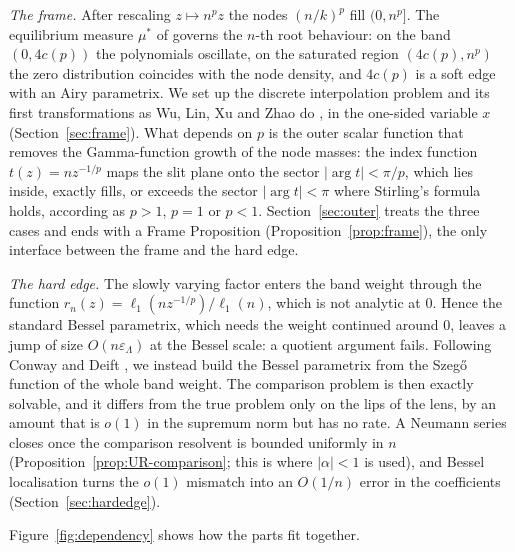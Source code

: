\emph{The frame.} After rescaling $z\mapsto n^pz$ the nodes $(n/k)^p$ fill $(0,n^p]$. The equilibrium measure $\mu^*$
of \cite{Paper1} governs the $n$-th root behaviour: on the band $(0,4c(p))$ the polynomials oscillate, on the saturated
region $(4c(p),n^p)$ the zero distribution coincides with the node density, and $4c(p)$ is a soft edge with an
Airy parametrix. We set up the discrete interpolation problem and its first transformations as Wu, Lin, Xu and Zhao
do \cite{WLXZ}, in the one-sided variable $x$ (Section~\ref{sec:frame}). What depends on $p$ is the outer scalar
function that removes the Gamma-function growth of the node masses: the index function $t(z)=nz^{-1/p}$ maps the slit
plane onto the sector $|\arg t|<\pi/p$, which lies inside, exactly fills, or exceeds the sector $|\arg t|<\pi$ where
Stirling's formula holds, according as $p>1$, $p=1$ or $p<1$. Section~\ref{sec:outer} treats the three cases and ends
with a Frame Proposition (Proposition~\ref{prop:frame}), the only interface between the frame and the hard edge.

\emph{The hard edge.} The slowly varying factor enters the band weight through the function
$r_n(z)=\ell_1(nz^{-1/p})/\ell_1(n)$, which is not analytic at $0$. Hence the standard Bessel parametrix, which needs the weight continued around $0$, leaves
a jump of size $O(n\varepsilon_\Lambda)$ at the Bessel scale: a quotient argument fails. Following Conway and Deift
\cite{CD}, we instead build the Bessel parametrix from the Szeg\H{o} function of the whole band weight. The comparison
problem is then exactly solvable, and it differs from the true problem only on the lips of the lens, by an amount that
is $o(1)$ in the supremum norm but has no rate. A Neumann series closes once the comparison resolvent is bounded
uniformly in $n$ (Proposition~\ref{prop:UR-comparison}; this is where $|\alpha|<1$ is used), and Bessel localisation
turns the $o(1)$ mismatch into an $O(1/n)$ error in the coefficients (Section~\ref{sec:hardedge}).

Figure~\ref{fig:dependency} shows how the parts fit together.

